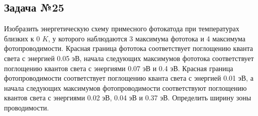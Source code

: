 \subsection{Задача №25}

Изобразить энергетическую схему примесного фотокатода при температурах близких к 0 $K$, у которого наблюдаются 3 максимума фототока и 4 максимума фотопроводимости. Красная граница фототока соответствует поглощению кванта света с энергией 0.05 эВ, начала следующих максимумов фототока соответствует поглощению квантов света с энергиями 0.07 эВ и 0.4 эВ. Красная граница фотопроводимости соответствует поглощению кванта света с энергией 0.01 эВ, а начала следующих максимумов фотопроводимости соответствуют поглощению квантов света с энергиями 0.02 эВ, 0.04 эВ и 0.37 эВ. Определить ширину зоны проводимости.
